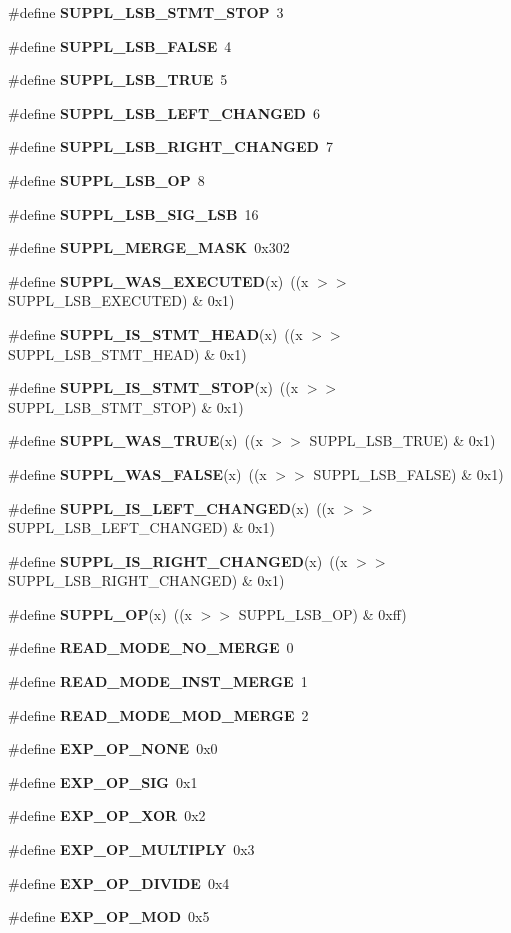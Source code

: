 \begin{CompactItemize}
\item 
\#define {\bf SUPPL\_\-LSB\_\-STMT\_\-STOP}\ 3
\item 
\#define {\bf SUPPL\_\-LSB\_\-FALSE}\ 4
\item 
\#define {\bf SUPPL\_\-LSB\_\-TRUE}\ 5
\item 
\#define {\bf SUPPL\_\-LSB\_\-LEFT\_\-CHANGED}\ 6
\item 
\#define {\bf SUPPL\_\-LSB\_\-RIGHT\_\-CHANGED}\ 7
\item 
\#define {\bf SUPPL\_\-LSB\_\-OP}\ 8
\item 
\#define {\bf SUPPL\_\-LSB\_\-SIG\_\-LSB}\ 16
\item 
\#define {\bf SUPPL\_\-MERGE\_\-MASK}\ 0x302
\item 
\#define {\bf SUPPL\_\-WAS\_\-EXECUTED}(x)\ ((x $>$$>$ SUPPL\_\-LSB\_\-EXECUTED) \& 0x1)
\item 
\#define {\bf SUPPL\_\-IS\_\-STMT\_\-HEAD}(x)\ ((x $>$$>$ SUPPL\_\-LSB\_\-STMT\_\-HEAD) \& 0x1)
\item 
\#define {\bf SUPPL\_\-IS\_\-STMT\_\-STOP}(x)\ ((x $>$$>$ SUPPL\_\-LSB\_\-STMT\_\-STOP) \& 0x1)
\item 
\#define {\bf SUPPL\_\-WAS\_\-TRUE}(x)\ ((x $>$$>$ SUPPL\_\-LSB\_\-TRUE) \& 0x1)
\item 
\#define {\bf SUPPL\_\-WAS\_\-FALSE}(x)\ ((x $>$$>$ SUPPL\_\-LSB\_\-FALSE) \& 0x1)
\item 
\#define {\bf SUPPL\_\-IS\_\-LEFT\_\-CHANGED}(x)\ ((x $>$$>$ SUPPL\_\-LSB\_\-LEFT\_\-CHANGED) \& 0x1)
\item 
\#define {\bf SUPPL\_\-IS\_\-RIGHT\_\-CHANGED}(x)\ ((x $>$$>$ SUPPL\_\-LSB\_\-RIGHT\_\-CHANGED) \& 0x1)
\item 
\#define {\bf SUPPL\_\-OP}(x)\ ((x $>$$>$ SUPPL\_\-LSB\_\-OP) \& 0xff)
\item 
\#define {\bf READ\_\-MODE\_\-NO\_\-MERGE}\ 0
\item 
\#define {\bf READ\_\-MODE\_\-INST\_\-MERGE}\ 1
\item 
\#define {\bf READ\_\-MODE\_\-MOD\_\-MERGE}\ 2
\item 
\#define {\bf EXP\_\-OP\_\-NONE}\ 0x0
\item 
\#define {\bf EXP\_\-OP\_\-SIG}\ 0x1
\item 
\#define {\bf EXP\_\-OP\_\-XOR}\ 0x2
\item 
\#define {\bf EXP\_\-OP\_\-MULTIPLY}\ 0x3
\item 
\#define {\bf EXP\_\-OP\_\-DIVIDE}\ 0x4
\item 
\#define {\bf EXP\_\-OP\_\-MOD}\ 0x5

\end{CompactItemize}

